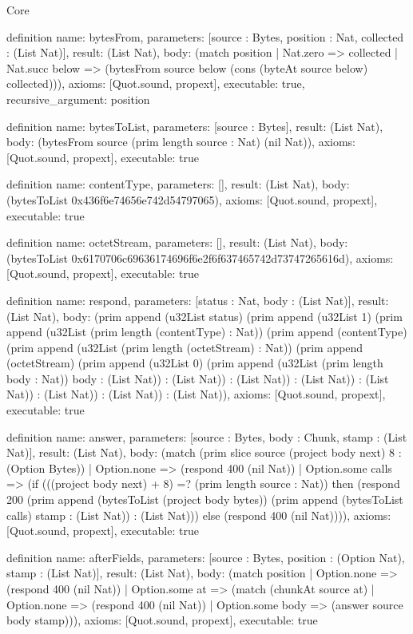 \begin{lexlean}{Core}
\begin{semanticmodule}
definition{
  name: bytesFrom,
  parameters: [source : Bytes, position : Nat, collected : (List Nat)],
  result: (List Nat),
  body: (match position
    | Nat.zero => collected
    | Nat.succ below => (bytesFrom source below (cons (byteAt source below) collected))),
  axioms: [Quot.sound, propext],
  executable: true,
  recursive_argument: position
}

definition{
  name: bytesToList,
  parameters: [source : Bytes],
  result: (List Nat),
  body: (bytesFrom source (prim length source : Nat) (nil Nat)),
  axioms: [Quot.sound, propext],
  executable: true
}

definition{
  name: contentType,
  parameters: [],
  result: (List Nat),
  body: (bytesToList 0x436f6e74656e742d54797065),
  axioms: [Quot.sound, propext],
  executable: true
}

definition{
  name: octetStream,
  parameters: [],
  result: (List Nat),
  body: (bytesToList 0x6170706c69636174696f6e2f6f637465742d73747265616d),
  axioms: [Quot.sound, propext],
  executable: true
}

definition{
  name: respond,
  parameters: [status : Nat, body : (List Nat)],
  result: (List Nat),
  body: (prim append (u32List status) (prim append (u32List 1) (prim append (u32List (prim length (contentType) : Nat)) (prim append (contentType) (prim append (u32List (prim length (octetStream) : Nat)) (prim append (octetStream) (prim append (u32List 0) (prim append (u32List (prim length body : Nat)) body : (List Nat)) : (List Nat)) : (List Nat)) : (List Nat)) : (List Nat)) : (List Nat)) : (List Nat)) : (List Nat)),
  axioms: [Quot.sound, propext],
  executable: true
}

definition{
  name: answer,
  parameters: [source : Bytes, body : Chunk, stamp : (List Nat)],
  result: (List Nat),
  body: (match (prim slice source (project body next) 8 : (Option Bytes))
    | Option.none => (respond 400 (nil Nat))
    | Option.some calls => (if (((project body next) + 8) =? (prim length source : Nat)) then (respond 200 (prim append (bytesToList (project body bytes)) (prim append (bytesToList calls) stamp : (List Nat)) : (List Nat))) else (respond 400 (nil Nat)))),
  axioms: [Quot.sound, propext],
  executable: true
}

definition{
  name: afterFields,
  parameters: [source : Bytes, position : (Option Nat), stamp : (List Nat)],
  result: (List Nat),
  body: (match position
    | Option.none => (respond 400 (nil Nat))
    | Option.some at => (match (chunkAt source at)
      | Option.none => (respond 400 (nil Nat))
      | Option.some body => (answer source body stamp))),
  axioms: [Quot.sound, propext],
  executable: true
}


\end{semanticmodule}
\end{lexlean}
